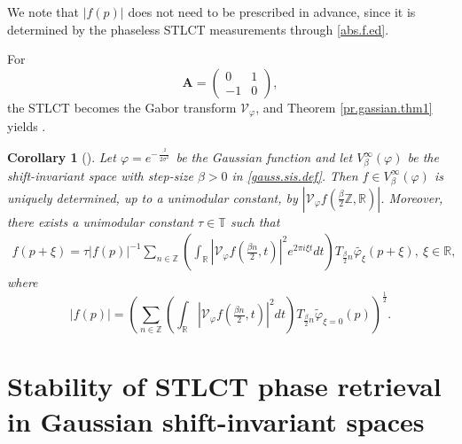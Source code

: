 \documentclass[11pt, reqno]{amsart}
\newtheorem{corollary}[theorem]{Corollary}%
\newcommand{\Z}{\mathbb{Z}}
\newcommand{\R}{\mathbb{R}}
\newcommand{\T}{\mathbb{T}}
\numberwithin{equation}{section}
\begin{document}
We note that $|f(p)|$ does not need to be prescribed in advance, since it is determined by the phaseless STLCT measurements through \eqref{abs.f.ed}.

\smallskip

For $$
\mathbf{A}=\begin{pmatrix} 0 & 1 \\ -1 & 0 \end{pmatrix},$$ 
the STLCT becomes the Gabor transform $\mathcal{V}_{\varphi}$, and Theorem \ref{pr.gassian.thm1} yields  \cite[Theorem 3.6]{grohs2024stable}. 


\begin{corollary}[{\cite[Theorem 3.6]{grohs2024stable}}]\label{uni.gabor}
	Let $\varphi=e^{-\frac{\cdot^2}{2\sigma^2}}$  be the Gaussian function and let $V_{\beta}^{\infty}(\varphi)$ be the shift-invariant space with step-size $\beta>0$ in \eqref{gauss.sis.def}.  Then $f\in V_{\beta}^{\infty}(\varphi)$ is uniquely determined, up to a unimodular constant, by $|\mathcal{V}_\varphi f(\frac{\beta }{2} \Z,\R)|$. Moreover, there exists a unimodular constant $\tau\in \T$ such that
	\begin{align*}
		f(p+\xi)
		=
		\tau |f(p)|^{-1}
		\sum_{n\in \Z}
		\left(\int_{\R} |\mathcal{V}_\varphi f(\tfrac{\beta  n}{2},t)|^2 e^{2\pi i \xi t} dt \right)
		T_{\frac{\beta}{2}n} \widetilde{\varphi_\xi}(p+\xi), \  \xi\in \R,
	\end{align*}
	where
	\begin{equation*}
		|f(p)|
		=
		\left(
		\sum_{n\in \Z}
		\left(\int_{\R} |\mathcal{V}_\varphi f(\tfrac{\beta  n}{2},t)|^2 dt \right)
		T_{\frac{\beta}{2}n} \widetilde{\varphi}_{\xi=0}(p)
		\right)^{\frac{1}{2}}.
	\end{equation*}
\end{corollary}


\medskip
 
\section{Stability of STLCT phase retrieval in Gaussian shift-invariant spaces}\label{stable.sec}


\medskip 
\end{document}
